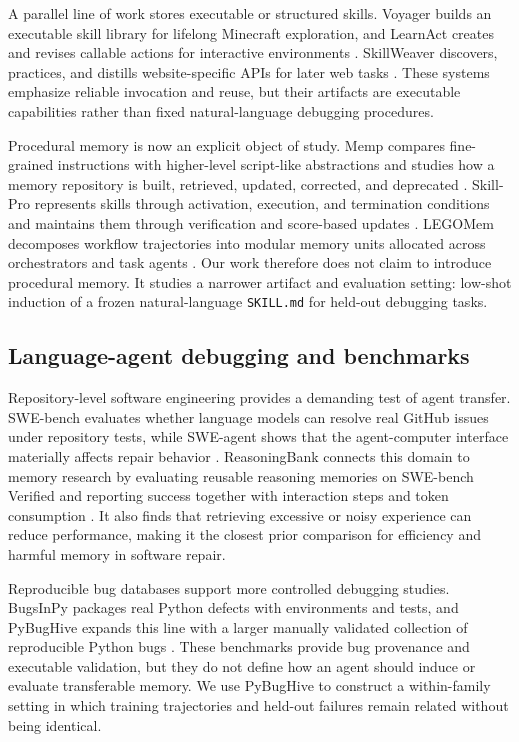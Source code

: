 A parallel line of work stores executable or structured skills. Voyager builds an executable skill library for lifelong Minecraft exploration, and LearnAct creates and revises callable actions for interactive environments \cite{wang2024voyager,zhao2024learnact}. SkillWeaver discovers, practices, and distills website-specific APIs for later web tasks \cite{zheng2025skillweaver}. These systems emphasize reliable invocation and reuse, but their artifacts are executable capabilities rather than fixed natural-language debugging procedures.

Procedural memory is now an explicit object of study. Memp compares fine-grained instructions with higher-level script-like abstractions and studies how a memory repository is built, retrieved, updated, corrected, and deprecated \cite{fang2026memp}. Skill-Pro represents skills through activation, execution, and termination conditions and maintains them through verification and score-based updates \cite{mi2026skillpro}. LEGOMem decomposes workflow trajectories into modular memory units allocated across orchestrators and task agents \cite{han2026legomem}. Our work therefore does not claim to introduce procedural memory. It studies a narrower artifact and evaluation setting: low-shot induction of a frozen natural-language \texttt{SKILL.md} for held-out debugging tasks.

\subsection{Language-agent debugging and benchmarks}
\label{sec:related_debugging}

Repository-level software engineering provides a demanding test of agent transfer. SWE-bench evaluates whether language models can resolve real GitHub issues under repository tests, while SWE-agent shows that the agent-computer interface materially affects repair behavior \cite{jimenez2024swebench,yang2024sweagent}. ReasoningBank connects this domain to memory research by evaluating reusable reasoning memories on SWE-bench Verified and reporting success together with interaction steps and token consumption \cite{ouyang2026reasoningbank}. It also finds that retrieving excessive or noisy experience can reduce performance, making it the closest prior comparison for efficiency and harmful memory in software repair.

Reproducible bug databases support more controlled debugging studies. BugsInPy packages real Python defects with environments and tests, and PyBugHive expands this line with a larger manually validated collection of reproducible Python bugs \cite{widyasari2020bugsinpy,antal2024pybughive}. These benchmarks provide bug provenance and executable validation, but they do not define how an agent should induce or evaluate transferable memory. We use PyBugHive to construct a within-family setting in which training trajectories and held-out failures remain related without being identical.

